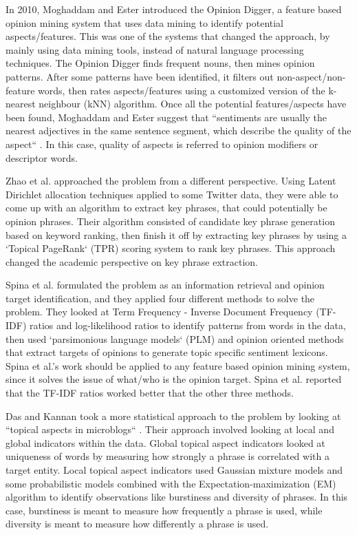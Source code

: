 \documentclass{sig-alternate}
\begin{document}
In 2010, Moghaddam and Ester introduced the Opinion Digger, a feature based opinion mining system that uses data mining to identify potential aspects/features. This was one of the systems that changed the approach, by mainly using data mining tools, instead of natural language processing techniques. The Opinion Digger finds frequent nouns, then mines opinion patterns. After some patterns have been identified, it filters out non-aspect/non-feature words, then rates aspects/features using a customized version of the k-nearest neighbour (kNN) algorithm. Once all the potential features/aspects have been found, Moghaddam and Ester suggest that ``sentiments are usually the nearest adjectives in the same sentence segment, which describe the quality of the aspect`` \cite{MoghaddamEster2010}. In this case, quality of aspects is referred to opinion modifiers or descriptor words.

Zhao et al. \cite{ZhaoJiangHeSongAchananuparpLimLi2011} approached the problem from a different perspective. Using Latent Dirichlet allocation techniques applied to some Twitter data, they were able to come up with an algorithm to extract key phrases, that could potentially be opinion phrases. Their algorithm consisted of candidate key phrase generation based on keyword ranking, then finish it off by extracting key phrases by using a `Topical PageRank` (TPR) scoring system to rank key phrases. This approach changed the academic perspective on key phrase extraction.

Spina et al. \cite{SpinaMeijDeRijkeOghinaBuiBreuss2012} formulated the problem as an information retrieval and opinion target identification, and they applied four different methods to solve the problem. They looked at Term Frequency - Inverse Document Frequency (TF-IDF) ratios and log-likelihood ratios to identify patterns from words in the data, then used `parsimonious language models` (PLM) and opinion oriented methods that extract targets of opinions to generate topic specific sentiment lexicons. Spina et al.'s work should be applied to any feature based opinion mining system, since it solves the issue of what/who is the opinion target. Spina et al. reported that the TF-IDF ratios worked better that the other three methods.

Das and Kannan took a more statistical approach to the problem by looking at ``topical aspects in microblogs`` \cite{MoghaddamEster2010}. Their approach involved looking at local and global indicators within the data. Global topical aspect indicators looked at uniqueness of words by measuring how strongly a phrase is correlated with a target entity. Local topical aspect indicators used Gaussian mixture models and some probabilistic models combined with the Expectation-maximization (EM) algorithm to identify observations like burstiness and diversity of phrases. In this case, burstiness is meant to measure how frequently a phrase is used, while diversity is meant to measure how differently a phrase is used.
\end{document}
